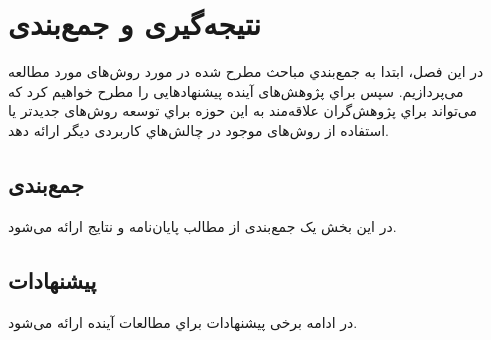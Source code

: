 \chapter{نتیجه‌گیری و جمع‌بندی}\label{S5}
\pagestyle{plain}


در اين فصل، ابتدا به جمع‌بندي مباحث مطرح‌ شده در مورد روش‌های مورد مطالعه می‌پردازيم. سپس براي پژوهش‌های آينده پيشنهادهايی را مطرح خواهيم كرد كه می‌تواند براي پژوهش‌گران علاقه‌مند به اين حوزه براي توسعه روش‌های جديدتر يا استفاده از روش‌های موجود در چالش‌هاي كاربردی ديگر ارائه دهد.
\section{جمع‌بندی}

در این بخش یک جمع‌بندی از مطالب پایان‌نامه و نتایج ارائه می‌شود. 

\section{پيشنهادات}
در ادامه برخی پيشنهادات براي مطالعات آينده ارائه می‌شود.

























